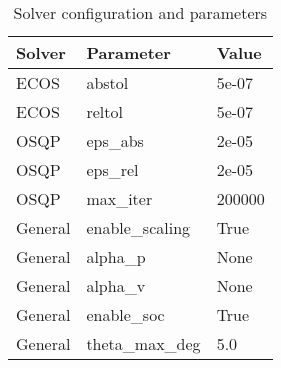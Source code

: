 \begin{table}[t]
\centering
\begin{tabular}{lll}
\toprule
Solver & Parameter & Value \\
\midrule
ECOS & abstol & 5e-07 \\
ECOS & reltol & 5e-07 \\
OSQP & eps_abs & 2e-05 \\
OSQP & eps_rel & 2e-05 \\
OSQP & max_iter & 200000 \\
General & enable_scaling & True \\
General & alpha_p & None \\
General & alpha_v & None \\
General & enable_soc & True \\
General & theta_max_deg & 5.0 \\
\bottomrule
\end{tabular}
\caption{Solver configuration and parameters}
\label{tab:solver_settings}
\end{table}
